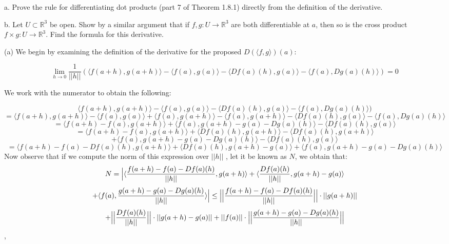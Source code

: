 \newpage

\begin{exercise}{6}
    a. Prove the rule for differentiating dot products (part 7 of Theorem 1.8.1) directly from the definition of the derivative.

    b. Let $U \subset \mathbb{R}^3$ be open.
    Show by a similar argument that if $f, g: U \rightarrow \mathbb{R}^3$ are both differentiable at $a$, then so is the cross product $f \times g: U \rightarrow \mathbb{R}^3$.
    Find the formula for this derivative.
\end{exercise}

\begin{solution}

    (a) We begin by examining the definition of the derivative for the proposed $D (\langle f, g \rangle)(a)$:
    
    $$\lim_{h \rightarrow 0}\frac{1}{\lvert \lvert h \rvert \rvert}(\langle f(a+h), g(a+h) \rangle - \langle f(a), g(a) \rangle - \langle D f(a)(h), g(a) \rangle - \langle f(a), D g(a)(h) \rangle) = 0$$
     
     We work with the numerator to obtain the following:

     $$\langle f(a+h), g(a+h) \rangle - \langle f(a), g(a) \rangle - \langle D f(a)(h), g(a) \rangle - \langle f(a), D g(a)(h) \rangle)$$
     $$ = \langle f(a+h), g(a+h) \rangle - \langle f(a), g(a) \rangle + \langle f(a), g(a+h) \rangle - \langle f(a), g(a+h) \rangle - \langle D f(a)(h), g(a) \rangle - \langle f(a), D g(a) (h) \rangle$$
     $$ = \langle f(a+h) - f(a), g(a + h) \rangle + \langle f(a), g(a+h) - g(a) - Dg(a)(h)\rangle - \langle Df(a)(h), g(a) \rangle$$
     $$ = \langle f(a + h) - f(a), g(a + h) \rangle + \langle D f(a)(h), g(a + h) \rangle - \langle D f(a)(h), g(a + h) \rangle $$
     $$+ \langle f(a), g(a + h) - g(a) - D g (a)(h) \rangle - \langle Df(a)(h), g(a) \rangle$$
     $$= \langle f(a+h) - f(a) - D f(a)(h), g(a+h) \rangle + \langle Df(a)(h), g(a+h) - g(a) \rangle + \langle f(a), g(a+h) - g(a) - Dg(a)(h) \rangle$$
     Now observe that if we compute the norm of this expression over $\lvert \lvert h \rvert \rvert$ , let it be known as $N$, we obtain that:
     $$N = \Bigl \lvert \langle \frac{f(a+h) - f(a) - Df(a)(h)}{\lvert \lvert h \rvert \rvert}, g(a+h) \rangle + \langle \frac{Df(a)(h)}{\lvert \lvert h \rvert \rvert}, g(a+h) - g(a) \rangle $$
     $$+ \langle f(a), \frac{g(a+h) - g(a) - Dg(a)(h)}{\lvert \lvert h \rvert \rvert} \rangle \Bigr \rvert
     \leq \Bigl \lvert \Bigl \lvert \frac{f(a+h) - f(a) - Df(a)(h)}{\lvert \lvert h \rvert \rvert} \Bigr \rvert \Bigr \rvert \cdot \lvert \lvert g(a+h) \rvert \rvert $$
     $$ + \Bigl \lvert \Bigl \lvert \frac{Df(a)(h)}{\lvert \lvert h \rvert \rvert} \Bigr \rvert \Bigr \rvert \cdot \lvert \lvert g(a+h) - g(a) \rvert \rvert + \lvert \lvert f(a) \rvert \rvert \cdot \Bigl \lvert \Bigl \lvert \frac{g(a+h) - g(a) - Dg(a)(h)}{\lvert \lvert h \rvert \rvert} \Bigr \rvert \Bigr \rvert$$,


\end{solution}
